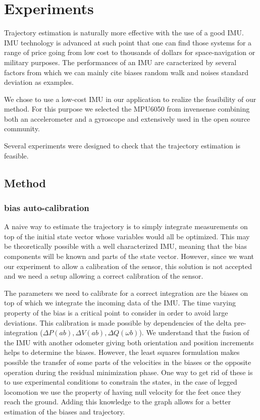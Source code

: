 
\section{Experiments} \label{sec:experiments}

Trajectory estimation is naturally more effective with the use of a good IMU. IMU technology is advanced at such point that 
one can find those systems for a range of price going from low cost to thousands of dollars for space-navigation or military purposes.
The performances of an IMU are caracterized by several factors from which we can mainly cite biases random walk and noises standard deviation
as examples.

We chose to use a low-cost IMU in our application to realize the feasibility of our method. For this purpose we selected the 
MPU6050 from invensense combining both an accelerometer and a gyroscope and extensively used in the open source community.

Several experiments were designed to check that the trajectory estimation is feasible.

\subsection{Method}
\subsubsection{bias auto-calibration}
A naive way to estimate the trajectory is to simply integrate measurements on top of the initial state vector whose variables would all be optimized. 
This may be theoretically possible with a well characterized IMU, meaning that the bias components will be known and parts of the state vector.
However, since we want our experiment to allow a calibration of the sensor, this solution is not accepted and we need a setup allowing a correct calibration of the sensor.

The parameters we need to calibrate for a correct integration are the biases on top of which we integrate the incoming data of the IMU.
The time varying property of the bias is a critical point to consider in order to avoid large deviations. This calibration is made possible
by dependencies of the delta pre-integration ($\Delta P(ab), \Delta V(ab), \Delta Q(\omega b)$). We understand that the fusion of the IMU with another odometer giving both
orientation and position increments helps to determine the biases. However, the least squares formulation makes possible the transfer of some parts
of the velocities in the biases or the opposite operation during the residual minimization phase. One way to get rid of these is to use experimental conditions to constrain the states, in the case of legged
locomotion we use the property of having null velocity for the feet once they reach the ground. Adding this knowledge to the graph allows for a
better estimation of the biases and trajectory.

